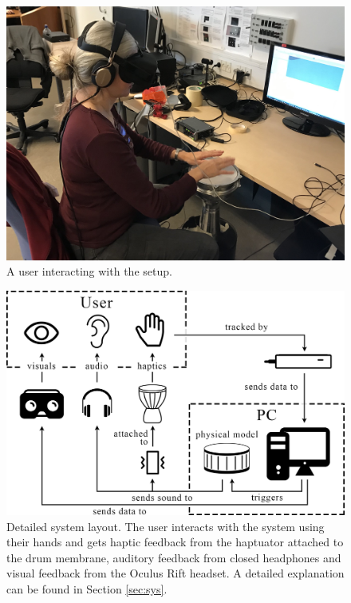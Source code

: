     \begin{figure}[t]
        \centering

    \includegraphics[width=\paperFigWidth\textwidth]{figures/user.jpg}
    \caption{A user interacting with the setup.}
    \centering
    \label{fig:user}
    \end{figure}
    \begin{figure}[t]
        \centering

    \includegraphics[width=\paperFigWidth\textwidth]{figures/systemlayout-updated.png}
    \caption{Detailed system layout. The user interacts with the system using their hands and gets haptic feedback from the haptuator attached to the drum membrane, auditory feedback from closed headphones and visual feedback from the Oculus Rift headset. A detailed explanation can be found in Section \ref{sec:sys}.}
    \centering
    \label{fig:systemLayout}
    \end{figure}
